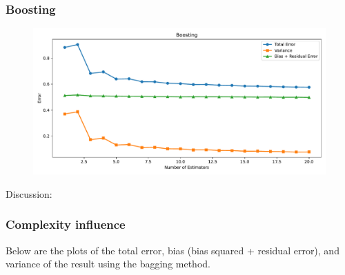 \documentclass[a4paper,10pt]{article}
\begin{document}
\subsubsection{Boosting}
\begin{figure}[H]
    \centering
    \includegraphics[width=0.8\linewidth]{images/2.5_boosting.pdf}
\end{figure}

Discussion:

\subsubsection{Complexity influence}

Below are the plots of the total error, bias (bias squared + residual error), and variance of the result using the bagging method.
\end{document}
